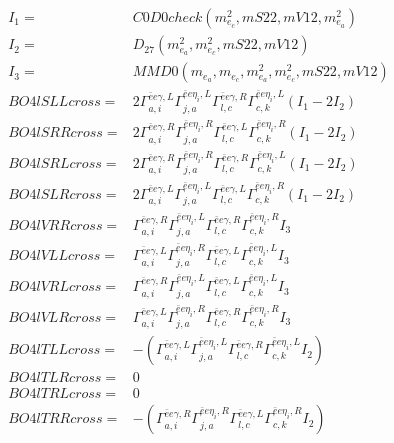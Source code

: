 \documentclass[A4,landscape]{article}
\begin{document}
\begin{align} 
I_1 = & C0D0check(m^2_{e_{{c}}}, mS22, mV12, m^2_{e_{{a}}}) \\ 
I_2 = & D_{27}(m^2_{e_{{a}}}, m^2_{e_{{c}}}, mS22, mV12) \\ 
I_3 = & MMD0(m_{e_{{a}}}, m_{e_{{c}}}, m^2_{e_{{a}}}, m^2_{e_{{c}}}, mS22, mV12) \\ 
  BO4lSLLcross= & 2  \Gamma^{\bar{e}e \gamma ,L}_{a, i} \Gamma^{\bar{e}e \eta_i ,L}_{j, a} \Gamma^{\bar{e}e \gamma ,R}_{l, c} \Gamma^{\bar{e}e \eta_i ,L}_{c, k} (I_1 - 2 I_2) \\ 
  BO4lSRRcross= & 2  \Gamma^{\bar{e}e \gamma ,R}_{a, i} \Gamma^{\bar{e}e \eta_i ,R}_{j, a} \Gamma^{\bar{e}e \gamma ,L}_{l, c} \Gamma^{\bar{e}e \eta_i ,R}_{c, k} (I_1 - 2 I_2) \\ 
  BO4lSRLcross= & 2  \Gamma^{\bar{e}e \gamma ,R}_{a, i} \Gamma^{\bar{e}e \eta_i ,R}_{j, a} \Gamma^{\bar{e}e \gamma ,R}_{l, c} \Gamma^{\bar{e}e \eta_i ,L}_{c, k} (I_1 - 2 I_2) \\ 
  BO4lSLRcross= & 2  \Gamma^{\bar{e}e \gamma ,L}_{a, i} \Gamma^{\bar{e}e \eta_i ,L}_{j, a} \Gamma^{\bar{e}e \gamma ,L}_{l, c} \Gamma^{\bar{e}e \eta_i ,R}_{c, k} (I_1 - 2 I_2) \\ 
  BO4lVRRcross= &  \Gamma^{\bar{e}e \gamma ,R}_{a, i} \Gamma^{\bar{e}e \eta_i ,L}_{j, a} \Gamma^{\bar{e}e \gamma ,R}_{l, c} \Gamma^{\bar{e}e \eta_i ,R}_{c, k} I_3 \\ 
  BO4lVLLcross= &  \Gamma^{\bar{e}e \gamma ,L}_{a, i} \Gamma^{\bar{e}e \eta_i ,R}_{j, a} \Gamma^{\bar{e}e \gamma ,L}_{l, c} \Gamma^{\bar{e}e \eta_i ,L}_{c, k} I_3 \\ 
  BO4lVRLcross= &  \Gamma^{\bar{e}e \gamma ,R}_{a, i} \Gamma^{\bar{e}e \eta_i ,L}_{j, a} \Gamma^{\bar{e}e \gamma ,L}_{l, c} \Gamma^{\bar{e}e \eta_i ,L}_{c, k} I_3 \\ 
  BO4lVLRcross= &  \Gamma^{\bar{e}e \gamma ,L}_{a, i} \Gamma^{\bar{e}e \eta_i ,R}_{j, a} \Gamma^{\bar{e}e \gamma ,R}_{l, c} \Gamma^{\bar{e}e \eta_i ,R}_{c, k} I_3 \\ 
  BO4lTLLcross= & -( \Gamma^{\bar{e}e \gamma ,L}_{a, i} \Gamma^{\bar{e}e \eta_i ,L}_{j, a} \Gamma^{\bar{e}e \gamma ,R}_{l, c} \Gamma^{\bar{e}e \eta_i ,L}_{c, k} I_2) \\ 
  BO4lTLRcross= & 0 \\ 
  BO4lTRLcross= & 0 \\ 
  BO4lTRRcross= & -( \Gamma^{\bar{e}e \gamma ,R}_{a, i} \Gamma^{\bar{e}e \eta_i ,R}_{j, a} \Gamma^{\bar{e}e \gamma ,L}_{l, c} \Gamma^{\bar{e}e \eta_i ,R}_{c, k} I_2) \\ 
\end{align} 
\end{document}
